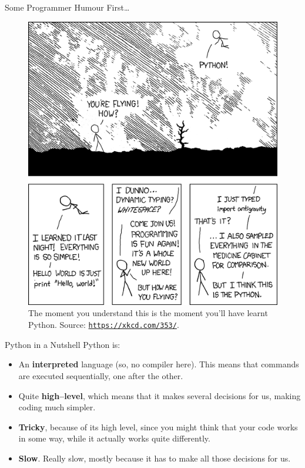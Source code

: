 \documentclass[aspectratio=169, 12pt, xcolor=table]{beamer}
\newcommand{\ohref}[1]{\href{#1}{\texttt{#1}}}
\begin{document}
	\sectionframe
	
	\begin{frame}{Some Programmer Humour First\ldots}
		\begin{figure}
			\centering
			\includegraphics[height=0.65\textheight]{./assets/xkcd_python.png}
			\caption{The moment you understand this is the moment you'll have learnt Python. Source: \ohref{https://xkcd.com/353/}.}
		\end{figure}
	\end{frame}
	
	\begin{frame}{Python in a Nutshell}
		Python is:
		\begin{itemize}
			\item An \textbf{interpreted} language (so, no compiler here). This means that commands are executed sequentially, one after the other.
			\item Quite \textbf{high--level}, which means that it makes several decisions for us, making coding much simpler.
			\item \textbf{Tricky}, because of its high level, since you might think that your code works in some way, while it actually works quite differently.
			\item \textbf{Slow}. Really slow, mostly because it has to make all those decisions for us.
		\end{itemize}
	\end{frame}
\end{document}
